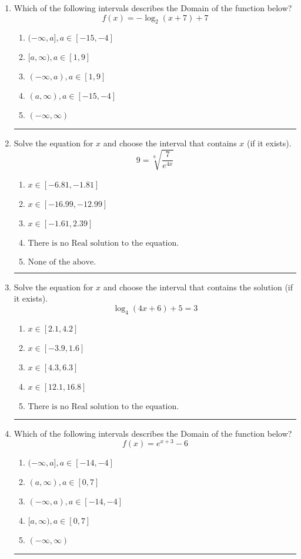 \documentclass[14pt]{extbook}
\newcommand{\litem}[1]{\item#1\hspace*{-1cm}\rule{\textwidth}{0.4pt}}
\begin{document}
\begin{enumerate}
{\begin{enumerate}[label=\Alph*.]
\end{enumerate} }
\litem{
Which of the following intervals describes the Domain of the function below?\[ f(x) = -\log_2{(x+7)}+7 \]\begin{enumerate}[label=\Alph*.]
\item \( (-\infty, a], a \in [-15, -4] \)
\item \( [a, \infty), a \in [1, 9] \)
\item \( (-\infty, a), a \in [1, 9] \)
\item \( (a, \infty), a \in [-15, -4] \)
\item \( (-\infty, \infty) \)

\end{enumerate} }
\litem{
 Solve the equation for $x$ and choose the interval that contains $x$ (if it exists).\[  9 = \sqrt[6]{\frac{7}{e^{4x}}} \]\begin{enumerate}[label=\Alph*.]
\item \( x \in [-6.81, -1.81] \)
\item \( x \in [-16.99, -12.99] \)
\item \( x \in [-1.61, 2.39] \)
\item \( \text{There is no Real solution to the equation.} \)
\item \( \text{None of the above.} \)

\end{enumerate} }
\litem{
Solve the equation for $x$ and choose the interval that contains the solution (if it exists).\[ \log_{4}{(4x+6)}+5 = 3 \]\begin{enumerate}[label=\Alph*.]
\item \( x \in [2.1, 4.2] \)
\item \( x \in [-3.9, 1.6] \)
\item \( x \in [4.3, 6.3] \)
\item \( x \in [12.1, 16.8] \)
\item \( \text{There is no Real solution to the equation.} \)

\end{enumerate} }
\litem{
Which of the following intervals describes the Domain of the function below?\[ f(x) = e^{x+3}-6 \]\begin{enumerate}[label=\Alph*.]
\item \( (-\infty, a], a \in [-14, -4] \)
\item \( (a, \infty), a \in [0, 7] \)
\item \( (-\infty, a), a \in [-14, -4] \)
\item \( [a, \infty), a \in [0, 7] \)
\item \( (-\infty, \infty) \)


\end{enumerate}}
\end{enumerate}
\end{document}
